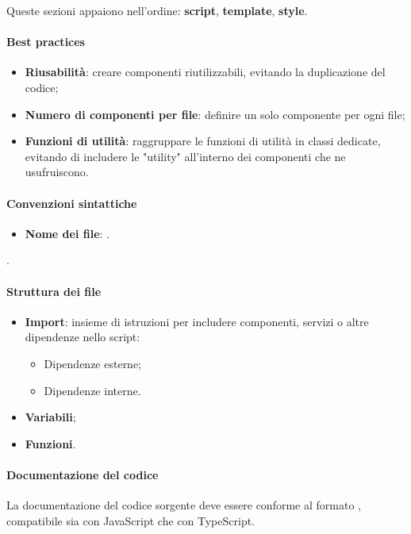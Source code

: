 \vspace{0.5\baselineskip}
\par Queste sezioni appaiono nell'ordine: \textbf{script}, \textbf{template}, \textbf{style}.

\paragraph*{Best practices}
\begin{itemize}
  \item \textbf{Riusabilità}: creare componenti riutilizzabili, evitando la duplicazione del codice;
  \item \textbf{Numero di componenti per file}: definire un solo componente per ogni file;
  \item \textbf{Funzioni di utilità}: raggruppare le funzioni di utilità in classi dedicate, evitando di includere le "utility" all'interno dei componenti che ne usufruiscono.
\end{itemize}

\paragraph*{Convenzioni sintattiche}
\begin{itemize}
  \item \textbf{Nome dei file}: .
\end{itemize}.

\paragraph*{Struttura dei file}
\begin{itemize}
  \item \textbf{Import}: insieme di istruzioni per includere componenti, servizi o altre dipendenze nello script:
  \begin{itemize}
    \item Dipendenze esterne;
    \item Dipendenze interne.
  \end{itemize}
  \item \textbf{Variabili};
  \item \textbf{Funzioni}.
\end{itemize}

\paragraph*{Documentazione del codice}
\vspace{0.5\baselineskip}
\par La documentazione del codice sorgente deve essere conforme al formato , compatibile sia con JavaScript che con TypeScript.

